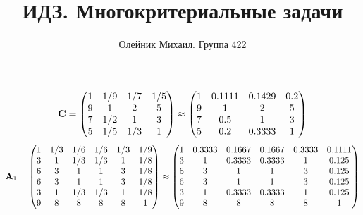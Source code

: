 \documentclass[10pt,a4paper]{article}
\title{ИДЗ. Многокритериальные задачи}
\author{Олейник Михаил. Группа 422}
\begin{document}
	\maketitle
	
	\[
		\bold{C} = 
		\begin{pmatrix}
			{1}{} & {1} / {{9}} & {1} / {{7}} & {1} / {{5}} \\
			{{9}}{} & {1}{} & {{2}}{} & {{5}}{} \\
			{{7}}{} & {1} / {{2}} & {1}{} & {{3}}{} \\
			{{5}}{} & {1} / {{5}} & {1} / {{3}} & {1}{} \\
		\end{pmatrix}
		\approx
		\begin{pmatrix}
			1        & 0.1111   & 0.1429   & 0.2      \\
			9        & 1        & 2        & 5        \\
			7        & 0.5      & 1        & 3        \\
			5        & 0.2      & 0.3333   & 1        \\
		\end{pmatrix}
	\]
	\[
		\bold{A}_{1} = 
		\begin{pmatrix}
			{1}{} & {1} / {{3}} & {1} / {{6}} & {1} / {{6}} & {1} / {{3}} & {1} / {{9}} \\
			{{3}}{} & {1}{} & {1} / {{3}} & {1} / {{3}} & {1}{} & {1} / {{8}} \\
			{{6}}{} & {{3}}{} & {1}{} & {1}{} & {{3}}{} & {1} / {{8}} \\
			{{6}}{} & {{3}}{} & {1}{} & {1}{} & {{3}}{} & {1} / {{8}} \\
			{{3}}{} & {1}{} & {1} / {{3}} & {1} / {{3}} & {1}{} & {1} / {{8}} \\
			{{9}}{} & {{8}}{} & {{8}}{} & {{8}}{} & {{8}}{} & {1}{} \\
		\end{pmatrix}
		\approx
		\begin{pmatrix}
			1        & 0.3333   & 0.1667   & 0.1667   & 0.3333   & 0.1111   \\
			3        & 1        & 0.3333   & 0.3333   & 1        & 0.125    \\
			6        & 3        & 1        & 1        & 3        & 0.125    \\
			6        & 3        & 1        & 1        & 3        & 0.125    \\
			3        & 1        & 0.3333   & 0.3333   & 1        & 0.125    \\
			9        & 8        & 8        & 8        & 8        & 1        \\
		\end{pmatrix}
	\]
\end{document}
